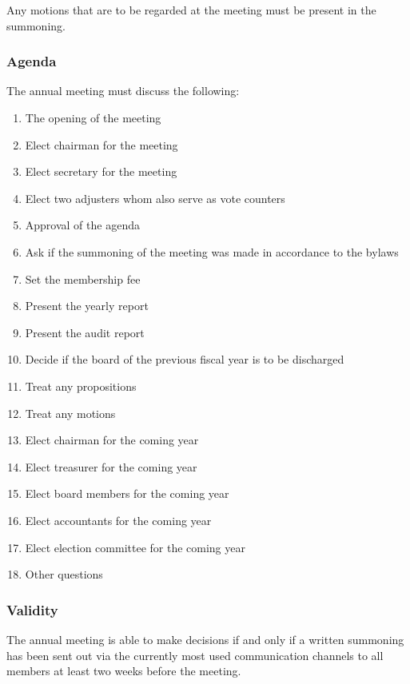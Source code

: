 \documentclass[a4paper]{article}
\begin{document}
Any motions that are to be regarded at the meeting must be present in the
summoning.

\newpage
\subsubsection{Agenda}
\label{sec:agenda}

The annual meeting must discuss the following:

\begin{enumerate}
    \item The opening of the meeting
    \item Elect chairman for the meeting
    \item Elect secretary for the meeting
    \item Elect two adjusters whom also serve as vote counters
    \item Approval of the agenda
    \item Ask if the summoning of the meeting was made in accordance to the bylaws
    \item Set the membership fee
    \item Present the yearly report
    \item Present the audit report
    \item Decide if the board of the previous fiscal year is to be discharged
    \item Treat any propositions
    \item Treat any motions
    \item Elect chairman for the coming year
    \item Elect treasurer for the coming year
    \item Elect board members for the coming year
    \item Elect accountants for the coming year
    \item Elect election committee for the coming year
    \item Other questions
\end{enumerate}

\subsubsection{Validity}

The annual meeting is able to make decisions if and only if a
written summoning has been sent out via the currently most used communication
channels to all members at least two weeks before the meeting.
\end{document}
